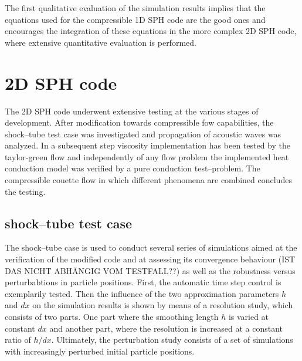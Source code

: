 \documentclass{report}
\begin{document}
The first qualitative evaluation of the simulation results implies that the equations used for the compressible 1D SPH code are the good ones and encourages the integration of these equations in the more complex 2D SPH code, where extensive quantitative evaluation is performed.  

 


\section{2D SPH code}
\label{sec:2DSPHcodeResults}

The 2D SPH code underwent extensive testing at the various stages of development. After modification towards compressible fow capabilities, the shock--tube test case was investigated and propagation of acoustic waves was analyzed. In a subsequent step viscosity implementation has been tested by the taylor-green flow and independently of any flow problem the implemented heat conduction model was verified by a pure conduction test--problem. The compressible couette flow in which different phenomena are combined concludes the testing.

\subsection{shock--tube test case}
\label{sec:2DSPHcodeResults_Shock}
The shock--tube case is used to conduct several series of simulations aimed at the verification of the modified code and at assessing its convergence behaviour (IST DAS NICHT ABHÄNGIG VOM TESTFALL??) as well as the robustness versus perturbabtions in particle positions. 
First, the automatic time step control is exemplarily tested. Then the influence of the two approximation parameters $h$ and $dx$ on the simulation results is shown by means of a resolution study, which consists of two parts. One part where the smoothing length $h$ is varied at constant $dx$ and another part, where the resolution is increased at a constant ratio of $h/dx$. Ultimately, the perturbation study consists of a set of simulations with increasingly perturbed initial particle positions.
\end{document}
